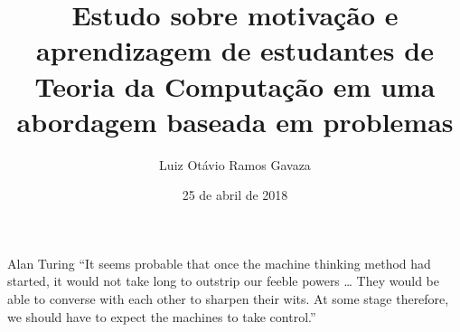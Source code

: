 \documentclass[msc, classic, a4paper]{ufbathesis}
\institute{Instituto de Matem\'{a}tica}
\title{Estudo sobre motivação e aprendizagem de estudantes de Teoria da Computação em uma abordagem baseada em problemas}
\date{25 de abril de 2018}
\author{Luiz Otávio Ramos Gavaza}
\newcommand{\suprimir}[1]{}
\begin{document}
\pgcompfrontpage

\frontmatter

\pgcomppresentationpage

\suprimir{

\authorcitationname{Sobrenome, Nome do ALUNO (usado em CITACOES)} %
\advisercitationname{Sobrenome, Nome do ORIENTADOR} %
\coadvisercitationname{Sobrenome, Nome do CO-ORIENTADOR} %
\catalogtype{Disserta\c{c}\~{a}o (Mestrado)} %

\catalogtopics{1. Primeira palavra-chave. 2. Segunda palavra-chave. 3. Terceira palavra-chave} %
\catalogcdd{XXX.XX} %
\catalogcdu{XXX.XX.XXX} %
\catalogingsheet


\approvalsheet{Salvador, DIA de MES de ANO}{
   \comittemember{Profa. Dra. Professora 1}{Universidade XYZ}
   \comittemember{Prof. Dr. Professor 2}{Universidade 123}
   \comittemember{Profa. Dra. Professora 3}{Universidade ABC}
}

}





\begin{epigraph}[1951]{Alan Turing}
``It seems probable that once the machine thinking
method had started, it would not take long to
outstrip our feeble powers \ldots
They would be able to converse with each other
to sharpen their wits.
At some stage therefore, we should have to expect the
machines to take control.''
\end{epigraph}



\end{document}
